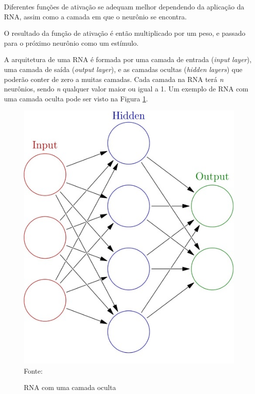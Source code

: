 \documentclass[
	12pt,					%
	openright,				%
	oneside,				%
	a4paper,				%
	bibjustif,				%
	chapter=TITLE,			%
	english,				%
	brazil,					%
	]{abntex2}
\newcommand{\source}[1]{\small Fonte: {#1}}
\begin{document}
	Diferentes funções de ativação se adequam melhor dependendo da aplicação da RNA,
	assim como a camada em que o neurônio se encontra.
	
	O resultado da função de ativação é então multiplicado por um peso,
	e passado para o próximo neurônio como um estímulo.
	
	A arquitetura de uma RNA é formada por uma camada de entrada (\textit{input layer}),
	uma camada de saída (\textit{output layer}),
	e as camadas ocultas (\textit{hidden layers})
	que poderão conter de zero a muitas camadas.
	Cada camada na RNA terá \textit{n} neurônios,
	sendo \textit{n} qualquer valor maior ou igual a 1.
	Um exemplo de RNA com uma camada oculta pode ser visto na Figura \ref{fig:basicnn}.
	
	\begin{figure}[ht!]
		\caption{RNA com uma camada oculta}
		\centering
		\includegraphics[scale=0.45]{img/BasicNN.jpg}\\
		\vspace{0.5mm}
		\source{}
		\label{fig:basicnn}
	\end{figure}
	
\end{document}
